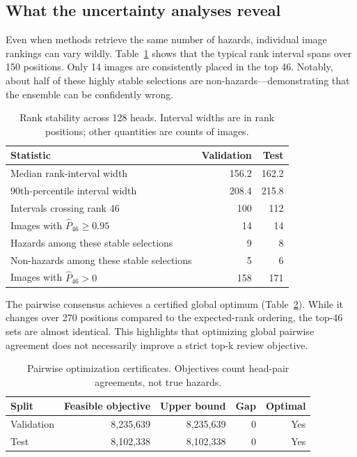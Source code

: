 \documentclass[10pt,a4paper]{article}
\begin{document}
\subsection{What the uncertainty analyses reveal}
Even when methods retrieve the same number of hazards, individual image rankings can vary wildly. Table~\ref{tab:stability} shows that the typical rank interval spans over 150 positions. Only 14 images are consistently placed in the top 46. Notably, about half of these highly stable selections are non-hazards---demonstrating that the ensemble can be confidently wrong.
\begin{table}[H]
\centering
\caption{Rank stability across 128 heads. Interval widths are in rank positions; other quantities are counts of images.}
\label{tab:stability}
\small
\begin{tabular}{lrr}
\toprule
Statistic & Validation & Test \\
\midrule
Median rank-interval width & 156.2 & 162.2 \\
90th-percentile interval width & 208.4 & 215.8 \\
Intervals crossing rank 46 & 100 & 112 \\
Images with $\widehat P_{46}\geq0.95$ & 14 & 14 \\
Hazards among these stable selections & 9 & 8 \\
Non-hazards among these stable selections & 5 & 6 \\
Images with $\widehat P_{46}>0$ & 158 & 171 \\
\bottomrule
\end{tabular}
\end{table}

The pairwise consensus achieves a certified global optimum (Table~\ref{tab:optimality}). While it changes over 270 positions compared to the expected-rank ordering, the top-46 sets are almost identical. This highlights that optimizing global pairwise agreement does not necessarily improve a strict top-k review objective.
\begin{table}[H]
\centering
\caption{Pairwise optimization certificates. Objectives count head-pair agreements, not true hazards.}
\label{tab:optimality}
\small
\begin{tabular}{lrrrr}
\toprule
Split & Feasible objective & Upper bound & Gap & Optimal \\
\midrule
Validation & 8,235,639 & 8,235,639 & 0 & Yes \\
Test & 8,102,338 & 8,102,338 & 0 & Yes \\
\bottomrule
\end{tabular}
\end{table}
\end{document}
